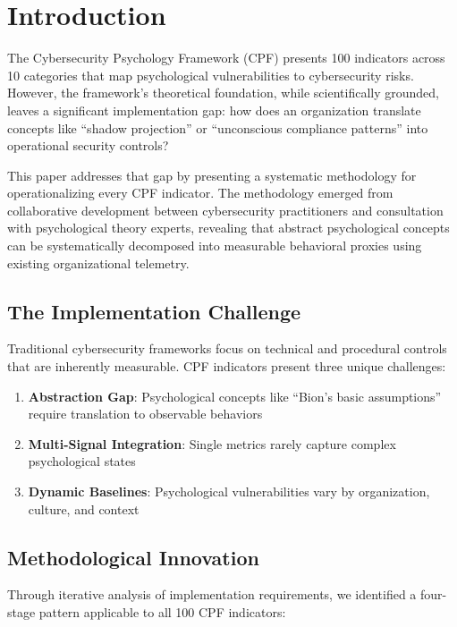 \documentclass[11pt, onecolumn]{article}
\begin{document}
\section{Introduction}

The Cybersecurity Psychology Framework (CPF) presents 100 indicators across 10 categories that map psychological vulnerabilities to cybersecurity risks\cite{canale2024}. However, the framework's theoretical foundation, while scientifically grounded, leaves a significant implementation gap: how does an organization translate concepts like ``shadow projection'' or ``unconscious compliance patterns'' into operational security controls?

This paper addresses that gap by presenting a systematic methodology for operationalizing every CPF indicator. The methodology emerged from collaborative development between cybersecurity practitioners and consultation with psychological theory experts, revealing that abstract psychological concepts can be systematically decomposed into measurable behavioral proxies using existing organizational telemetry.

\subsection{The Implementation Challenge}

Traditional cybersecurity frameworks focus on technical and procedural controls that are inherently measurable. CPF indicators present three unique challenges:

\begin{enumerate}
\item \textbf{Abstraction Gap}: Psychological concepts like ``Bion's basic assumptions'' require translation to observable behaviors
\item \textbf{Multi-Signal Integration}: Single metrics rarely capture complex psychological states
\item \textbf{Dynamic Baselines}: Psychological vulnerabilities vary by organization, culture, and context
\end{enumerate}

\subsection{Methodological Innovation}

Through iterative analysis of implementation requirements, we identified a four-stage pattern applicable to all 100 CPF indicators:
\end{document}
